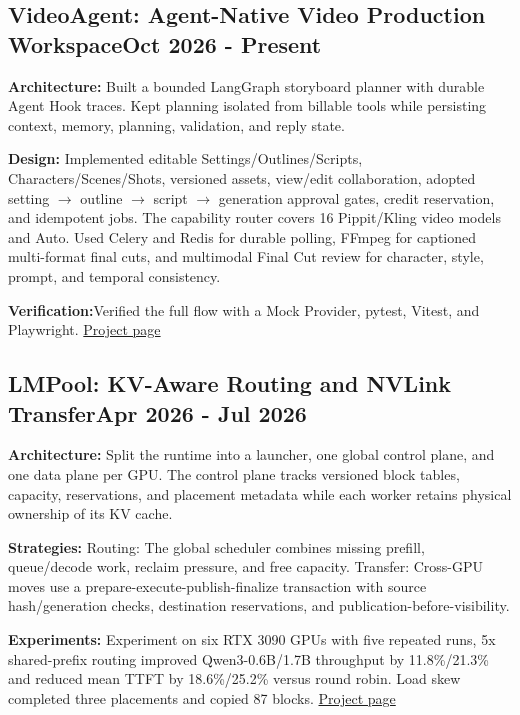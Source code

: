 \documentclass[letter, 12pt]{article}
\begin{document}
\subsection{{VideoAgent: Agent-Native Video Production Workspace}\hfill Oct 2026 - Present}
\begin{zitemize}
\item \textbf{Architecture:} Built a bounded LangGraph storyboard planner with durable Agent Hook traces. Kept planning isolated from billable tools while persisting context, memory, planning, validation, and reply state.
\item \textbf{Design:} Implemented editable Settings/Outlines/Scripts, Characters/Scenes/Shots, versioned assets, view/edit collaboration, adopted setting $\rightarrow$ outline $\rightarrow$ script $\rightarrow$ generation approval gates, credit reservation, and idempotent jobs. The capability router covers 16 Pippit/Kling video models and Auto. Used Celery and Redis for durable polling, FFmpeg for captioned multi-format final cuts, and multimodal Final Cut review for character, style, prompt, and temporal consistency.
\item \textbf{Verification:}Verified the full flow with a Mock Provider, pytest, Vitest, and Playwright. \href{https://0x0addc001.github.io/VideoAgent/}{Project page}
\end{zitemize}

\vspace*{8pt}
\subsection{{LMPool: KV-Aware Routing and NVLink Transfer}\hfill Apr 2026 - Jul 2026}
\begin{zitemize}
\item \textbf{Architecture:} Split the runtime into a launcher, one global control plane, and one data plane per GPU. The control plane tracks versioned block tables, capacity, reservations, and placement metadata while each worker retains physical ownership of its KV cache.
\item \textbf{Strategies:} Routing: The global scheduler combines missing prefill, queue/decode work, reclaim pressure, and free capacity. Transfer: Cross-GPU moves use a prepare-execute-publish-finalize transaction with source hash/generation checks, destination reservations, and publication-before-visibility.
\item \textbf{Experiments:} Experiment on six RTX 3090 GPUs with five repeated runs, 5x shared-prefix routing improved Qwen3-0.6B/1.7B throughput by 11.8\%/21.3\% and reduced mean TTFT by 18.6\%/25.2\% versus round robin. Load skew completed three placements and copied 87 blocks. \href{https://0x0addc001.github.io/LMPool/}{Project page}
\end{zitemize}
\end{document}
